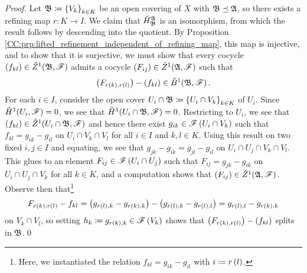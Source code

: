 \documentclass[../Moduli_Spaces_of_Riemann_Surfaces.tex]{subfiles}
\begin{document}
    \begin{proof}
        Let $\mathfrak{B}\coloneqq\left\{V_k\right\}_{k\in K}$ be an open covering of $X$ with $\mathfrak{B}\preceq\mathfrak{A}$, so there exists a refining map $r:K\to I$. We claim that $\check{H}^{\mathfrak{A}}_{\mathfrak{B}}$ is an isomorphism, from which the result follows by descending into the quotient. By Proposition \ref{CC:prp:lifted_refinement_independent_of_refining_map}, this map is injective, and to show that it is surjective, we must show that every cocycle $\left(f_{kl}\right)\in\check{Z}^1\!\left(\mathfrak{B},\mathscr{F}\right)$ admits a cocycle $\left(F_{ij}\right)\in\check{Z}^1\!\left(\mathfrak{A},\mathscr{F}\right)$ such that
        \begin{equation*}
            \left(F_{r\left(k\right),r\left(l\right)}\right)-\left(f_{kl}\right)\in\check{B}^1\!\left(\mathfrak{B},\mathscr{F}\right).
        \end{equation*}
        For each $i\in I$, consider the open cover $U_i\cap\mathfrak{B}\coloneqq\left\{U_i\cap V_k\right\}_{k\in K}$ of $U_i$. Since $\check{H}^1\!\left(U_i,\mathscr{F}\right)=0$, we see that $\check{H}^1\!\left(U_i\cap\mathfrak{B},\mathscr{F}\right)=0$. Restricting to $U_i$, we see that $\left(f_{kl}\right)\in\check{Z}^1\!\left(U_i\cap\mathfrak{B},\mathscr{F}\right)$ and hence there exist $g_{ik}\in\mathscr{F}\left(U_i\cap V_k\right)$ such that $f_{kl}=g_{ik}-g_{il}$ on $U_i\cap V_k\cap V_l$ for all $i\in I$ and $k,l\in K$. Using this result on two fixed $i,j\in I$ and equating, we see that $g_{jk}-g_{ik}=g_{jl}-g_{il}$ on $U_i\cap U_j\cap V_k\cap V_l$. This glues to an element $F_{ij}\in\mathscr{F}\left(U_i\cap U_j\right)$ such that $F_{ij}=g_{jk}-g_{ik}$ on $U_i\cap U_j\cap V_k$ for all $k\in K$, and a computation shows that $\left(F_{ij}\right)\in\check{Z}^1\!\left(\mathfrak{A},\mathscr{F}\right)$. Observe then that\footnote{Here, we instantiated the relation $f_{kl}=g_{ik}-g_{il}$ with $i\coloneqq r\left(l\right)$.}
        \begin{equation*}
            F_{r\left(k\right),r\left(l\right)}-f_{kl}=\left(g_{r\left(l\right),k}-g_{r\left(k\right),k}\right)-\left(g_{r\left(l\right),k}-g_{r\left(l\right),l}\right)=g_{r\left(l\right),l}-g_{r\left(k\right),k}
        \end{equation*}
        on $V_k\cap V_l$, so setting $h_k\coloneqq g_{r\left(k\right),k}\in\mathscr{F}\left(V_k\right)$ shows that $\left(F_{r\left(k\right),r\left(l\right)}\right)-\left(f_{kl}\right)$ splits in $\mathfrak{B}$.\qed
    \end{proof}
\end{document}

